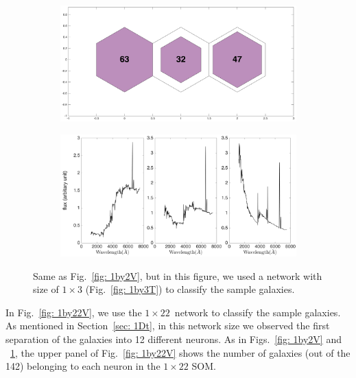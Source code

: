             \begin{figure}
                \begin{subfigure}[b]{\textwidth}
                    \centering
                    \includegraphics[width=\textwidth]{../image_paper2/1d/hit_v_1_by_3.png}
                \end{subfigure}
                \hfill
                \begin{subfigure}[b]{\textwidth}
                     \includegraphics[width=\textwidth]{../image_paper2/1d/SED_total1by3.png}
                \end{subfigure}
                \caption[Classification of fitted galaxy SEDs from \citet{Hossein12} using the $1\times3$~networks]{Same as Fig.~\ref{fig: 1by2V}, but in this figure, we used a network with size of $1\times3$ (Fig.~\ref{fig: 1by3T}) to classify the sample galaxies.}
                \label{fig: 1by3V}
            \end{figure}       
            
            In Fig.~\ref{fig: 1by22V}, we use the $1\times22$~network to classify the sample galaxies.
            As mentioned in Section~\ref{sec: 1Dt}, in this network size we observed the first separation of the  galaxies into 12 different neurons.
           As in Figs.~\ref{fig: 1by2V} and ~\ref{fig: 1by3V}, the upper panel of Fig.~\ref{fig: 1by22V} shows the number of galaxies (out of the 142) belonging to each neuron in the $1\times22$ SOM.

